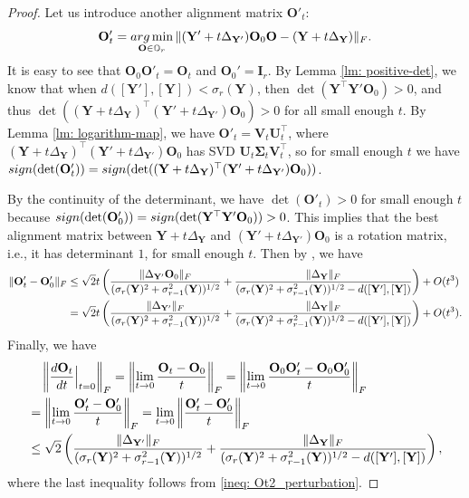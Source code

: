 \documentclass[11pt]{article}
\newcommand{\0}{{\mathbf{0}}}
\newcommand{\1}{{\mathbf{1}}}
\newcommand{\I}{{\mathbf{I}}}
\renewcommand{\O}{{\mathbf{O}}}
\newcommand{\U}{{\mathbf{U}}}
\newcommand{\V}{{\mathbf{V}}}
\newcommand{\Y}{{\mathbf{Y}}}
\newcommand{\bSigma}{\boldsymbol{\Sigma}}
\newcommand{\F}{{\rm F}}
\newcommand{\sign}{{\rm sign}}
\newcommand{\argmin}{\mathop{\rm arg\min}}
\newcommand{\bbO}{\mathbb{O}}
\newcommand{\nc}{\normalcolor}
\begin{document}
\begin{proof}
	Let us introduce another alignment matrix $\O'_t$: $$\O'_t = \argmin_{\O \in \bbO_r} \| (\Y' + t \Delta_{\Y'} ) \O_0 \O - (\Y + t\Delta_{\Y} )  \|_\F.$$ 
	It is easy to see that $\O_0 \O'_t = \O_t$ and $\O_0' = \I_r$. By Lemma \ref{lm: positive-det}, we know that when $d([\Y'], [\Y]) < \sigma_r(\Y)$, then $ \det(  \Y^\top \Y' \O_0  ) > 0 $, and thus $\det((\Y + t\Delta_{\Y} )^\top (\Y' + t \Delta_{\Y'} ) \O_0 ) >0$ for all small enough $t$. \nc By Lemma \ref{lm: logarithm-map}, we have $\O'_t = \V_t \U_t^\top$, where $(\Y + t\Delta_{\Y} )^\top (\Y' + t \Delta_{\Y'} ) \O_0$ has SVD $\U_t \bSigma_t \V_t^\top$, so for small enough $t$ we have $\sign(\det(\O'_t)) = \sign(\det((\Y + t\Delta_{\Y} )^\top (\Y' + t \Delta_{\Y'} ) \O_0 ))$.
	
	By the continuity of the determinant, we have $\det(\O'_t) > 0$ for small enough $t$ because $\sign(\det(\O'_0)) = \sign( \det(\Y^\top \Y' \O_0) ) > 0 $. This implies that the best alignment matrix between $\Y + t\Delta_{\Y}$ and $(\Y' + t \Delta_{\Y'})\O_0$ is a rotation matrix, i.e., it has determinant $1$, for small enough $t$. Then by \cite[Corollary 2.1]{soderkvist1993perturbation}, we have
	\begin{equation} \label{ineq: Ot2_perturbation}
	\begin{split}
		\|\O'_t - \O'_0\|_\F &\leq \sqrt{2} t \left( \frac{\| \Delta_{\Y'} \O_0 \|_\F }{ ( \sigma_r(\Y)^2 + \sigma^2_{r-1}(\Y) )^{1/2} } + \frac{\| \Delta_{\Y} \|_\F}{( \sigma_r(\Y)^2 + \sigma^2_{r-1}(\Y) )^{1/2} - d([\Y'], [\Y]) }  \right) + O(t^3)\\
		& = \sqrt{2} t \left( \frac{\| \Delta_{\Y'}\|_\F }{ ( \sigma_r(\Y)^2 + \sigma^2_{r-1}(\Y) )^{1/2} } + \frac{\| \Delta_{\Y} \|_\F}{( \sigma_r(\Y)^2 + \sigma^2_{r-1}(\Y) )^{1/2} - d([\Y'], [\Y]) }  \right) + O(t^3).
	\end{split} 
	\end{equation}
	Finally, we have
	\begin{equation*}
		\begin{split}
			& \quad \left\| \frac{d \O_t}{dt}\Big|_{t=0}  \right\|_\F  = \left\| \lim_{t \to 0} \frac{ \O_t - \O_0}{t}  \right\|_\F = \left\| \lim_{t \to 0} \frac{ \O_0\O'_t - \O_0 \O'_0}{t}  \right\|_\F 
			\\& = \left\| \lim_{t \to 0} \frac{ \O'_t - \O'_0}{t}  \right\|_\F  =\lim_{t \to 0} \left\|  \frac{ \O'_t - \O'_0}{t}\right\|_\F 
			\\&  \leq \nc  \sqrt{2} \left( \frac{\| \Delta_{\Y'} \|_\F }{ ( \sigma_r(\Y)^2 + \sigma^2_{r-1}(\Y) )^{1/2} } + \frac{\| \Delta_{\Y} \|_\F}{( \sigma_r(\Y)^2 + \sigma^2_{r-1}(\Y) )^{1/2} - d([\Y'], [\Y]) }   \right),
		\end{split}
	\end{equation*}
	where the last inequality follows from \eqref{ineq: Ot2_perturbation}.
\end{proof}
\end{document}
